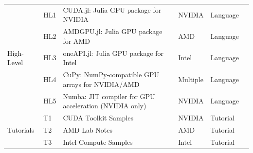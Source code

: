 \begin{table}[htbp]
\begin{tabular}{llp{8cm}lll}
		\hline
		\multirow{5}{*}{\small High-Level}
		                         & \small HL1         & \small CUDA.jl: Julia GPU package for NVIDIA                      & \small NVIDIA          & \small Language      & \small \cite{noauthor_juliagpucudajl_2025}            \\[1ex]
		                         & \small HL2         & \small AMDGPU.jl: Julia GPU package for AMD                       & \small AMD             & \small Language      & \small \cite{noauthor_juliagpuamdgpujl_2025}          \\[1ex]
		                         & \small HL3         & \small oneAPI.jl: Julia GPU package for Intel                     & \small Intel           & \small Language      & \small \cite{besard_oneapijl_2022}                    \\[1ex]
		                         & \small HL4         & \small CuPy: NumPy-compatible GPU arrays for NVIDIA/AMD           & \small Multiple        & \small Language      & \small \cite{okuta_cupy_2017, noauthor_cupycupy_2025} \\[1ex]
		                         & \small HL5         & \small Numba: JIT compiler for GPU acceleration (NVIDIA only)     & \small NVIDIA          & \small Language      & \small \cite{noauthor_numbanumba_2025}                \\
		\hline
		\multirow{5}{*}{\small Tutorials}
		                         & \small T1          & \small CUDA Toolkit Samples                                       & \small NVIDIA          & \small Tutorial      & \small \cite{noauthor_nvidiacuda-samples_2025}        \\[1ex]
		                         & \small T2          & \small AMD Lab Notes                                              & \small AMD             & \small Tutorial      & \small \cite{noauthor_amdamd-lab-notes_2025}          \\[1ex]
		                         & \small T3          & \small Intel Compute Samples                                      & \small Intel           & \small Tutorial      & \small \cite{noauthor_intelcompute-samples_2025}      \\
		\hline
	\end{tabular}
\end{table}